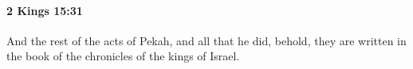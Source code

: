 
		\paragraph{2 Kings 15:31} %
			\label{2KINGS-15-31}

			And the rest of the acts of Pekah, and all that he did, behold, they are written in the book of the chronicles of the kings of Israel.


